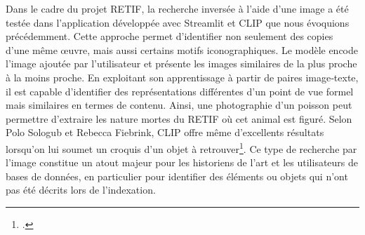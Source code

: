 Dans le cadre du projet RETIF, la recherche inversée à l’aide d’une image a été testée dans l’application développée avec Streamlit et CLIP que nous évoquions précédemment. Cette approche permet d’identifier non seulement des copies d’une même œuvre, mais aussi certains motifs iconographiques. Le modèle encode l’image ajoutée par l’utilisateur et présente les images similaires de la plus proche à la moins proche. En exploitant son apprentissage à partir de paires image‑texte, il est capable d’identifier des représentations différentes d’un point de vue formel mais similaires en termes de contenu. Ainsi, une photographie d’un poisson peut permettre d’extraire les nature mortes du RETIF où cet animal est figuré. Selon Polo Sologub et Rebecca Fiebrink, CLIP offre même d’excellents résultats lorsqu’on lui soumet un croquis d’un objet à retrouver\footcite{sologubSketchyCollectionsExploring2024}. Ce type de recherche par l’image constitue un atout majeur pour les historiens de l’art et les utilisateurs de bases de données, en particulier pour identifier des éléments ou objets qui n’ont pas été décrits lors de l’indexation.
